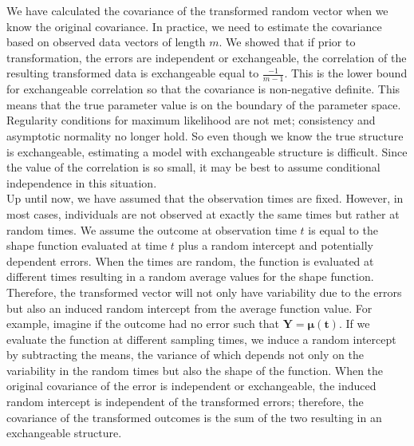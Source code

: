 \documentclass[12pt]{article}
\newcommand{\B}[0]{\mathbf}
\newcommand{\bs}[0]{\boldsymbol}
\begin{document}
We have calculated the covariance of the transformed random vector when we know the original covariance. In practice, we need to estimate the covariance based on observed data vectors of length $m$. We showed that if prior to transformation, the errors are independent or exchangeable, the correlation of the resulting transformed data is exchangeable equal to $\frac{-1}{m-1}$. This is the lower bound for exchangeable correlation so that the covariance is non-negative definite. This means that the true parameter value is on the boundary of the parameter space. Regularity conditions for maximum likelihood are not met; consistency and asymptotic normality no longer hold. So even though we know the true structure is exchangeable, estimating a model with exchangeable structure is difficult. Since the value of the correlation is so small, it may be best to assume conditional independence in this situation. \\
  
Up until now, we have assumed that the observation times are fixed. However, in most cases, individuals are not observed at exactly the same times but rather at random times. We assume the outcome at observation time $t$ is equal to the shape function evaluated at time $t$ plus a random intercept and potentially dependent errors. When the times are random, the function is evaluated at different times resulting in a random average values for the shape function. Therefore, the transformed vector will not only have variability due to the errors but also an induced random intercept from the average function value. For example, imagine if the outcome had no error such that
$\B Y =  \bs\mu(\B t). $
If we evaluate the function at different sampling times, we induce a random intercept by subtracting the means, the variance of which depends not only on the variability in the random times but also the shape of the function. When the original covariance of the error is independent or exchangeable, the induced random intercept is independent of the transformed errors; therefore, the covariance of the transformed outcomes is the sum of the two resulting in an exchangeable structure.\\
\end{document}
